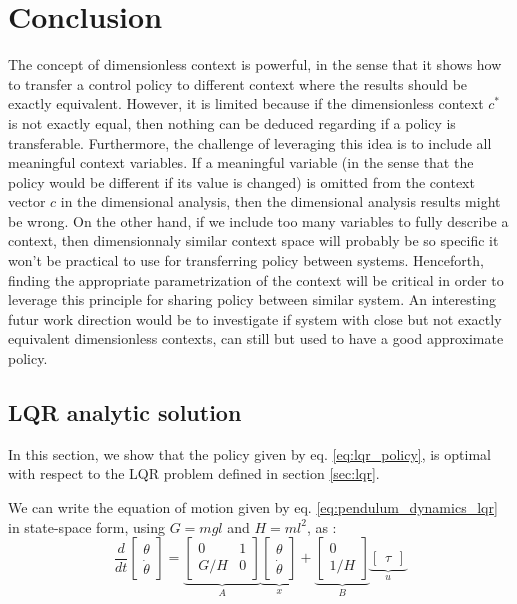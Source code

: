 \section{Conclusion}

The concept of dimensionless context is powerful, in the sense that it shows how to transfer a control policy to different context where the results should be exactly equivalent. However, it is limited because if the dimensionless context $c^*$ is not exactly equal, then nothing can be deduced regarding if a policy is transferable. Furthermore, the challenge of leveraging this idea is to include all meaningful context variables. If a meaningful variable (in the sense that the policy would be different if its value is changed) is omitted from the context vector $c$ in the dimensional analysis, then the dimensional analysis results might be wrong. On the other hand, if we include too many variables to fully describe a context, then dimensionnaly similar context space will probably be so specific it won't be practical to use for transferring policy between systems. Henceforth, finding the appropriate parametrization of the context will be critical in order to leverage this principle for sharing policy between similar system. An interesting futur work direction would be to investigate if system with close but not exactly equivalent dimensionless contexts, can still but used to have a good approximate policy.

\appendix
\subsection{LQR analytic solution}
\label{sec:lqr_proof}
In this section, we show that the policy given by eq. \eqref{eq:lqr_policy}, is optimal with respect to the LQR problem defined in section \ref{sec:lqr}.

We can write the equation of motion given by eq. \eqref{eq:pendulum_dynamics_lqr} in state-space form, using $G=mgl$ and $H=ml^2$, as :
\begin{equation}
\frac{d}{dt} 
\begin{bmatrix}
    \theta \\
    \dot{\theta} 
\end{bmatrix}
= 
\underbrace{
\begin{bmatrix}
    0 & 1 \\
    G/H & 0 
\end{bmatrix}
}_{A}
\underbrace{
\begin{bmatrix}
    \theta \\
    \dot{\theta} 
\end{bmatrix}
}_{x}
+
\underbrace{
\begin{bmatrix}
    0 \\
    1/H
\end{bmatrix}
}_{B}
\underbrace{
\begin{bmatrix}
    \tau
\end{bmatrix}
}_{u}
\end{equation}

